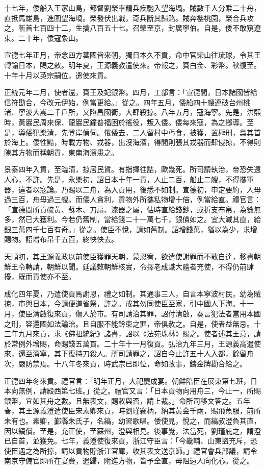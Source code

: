 \begin{pinyinscope}
十七年，倭船入王家山島，都督劉榮率精兵疾馳入望海堝。賊數千人分乘二十舟，直抵馬雄島，進圍望海堝。榮發伏出戰，奇兵斷其歸路。賊奔櫻桃園，榮合兵攻之，斬首七百四十二，生擒八百五十七。召榮至京，封廣寧伯。自是，倭不敢窺遼東。二十年，倭寇象山。

宣德七年正月，帝念四方蕃國皆來朝，獨日本久不貢，命中官柴山往琉球，令其王轉諭日本，賜之敕。明年夏，王源義教遣使來。帝報之，賚白金、彩幣。秋復至。十年十月以英宗嗣位，遣使來貢。

正統元年二月，使者還，賚王及妃銀幣。四月，工部言：「宣德間，日本諸國皆給信符勘合，今改元伊始，例當更給。」從之。四年五月，倭船四十艘連破台州桃渚、寧波大嵩二千戶所，又陷昌國衛，大肆殺掠。八年五月，寇海寧。先是，洪熙時，黃巖民周來保、龍巖民鐘普福困於徭役，叛入倭。倭每來寇，為之鄉導。至是，導倭犯樂清，先登岸偵伺。俄倭去，二人留村中丐食，被獲，置極刑，梟其首於海上。倭性黠，時載方物、戎器，出沒海濱，得間則張其戎器而肆侵掠，不得則陳其方物而稱朝貢，東南海濱患之。

景泰四年入貢，至臨清，掠居民貨。有指揮往詰，歐幾死。所司請執治，帝恐失遠人心，不許。先是，永樂初，詔日本十年一貢，人止二百，船止二艘，不得攜軍器，違者以寇論。乃賜以二舟，為入貢用，後悉不如制。宣德初，申定要約，人毋過三百，舟毋過三艘。而倭人貪利，貢物外所攜私物增十倍，例當給直。禮官言：「宣德間所貢硫黃、蘇木、刀扇、漆器之屬，估時直給錢鈔，或折支布帛，為數無多，然已大獲利。今若仍舊制，當給錢二十一萬七千，銀價如之。宜大減其直，給銀三萬四千七百有奇。」從之。使臣不悅，請如舊制。詔增錢萬，猶以為少，求增賜物。詔增布帛千五百，終怏怏去。

天順初，其王源義政以前使臣獲罪天朝，蒙恩宥，欲遣使謝罪而不敢自達，移書朝鮮王令轉請，朝鮮以聞。廷議敕朝鮮核實，令擇老成識大體者充使，不得仍前肆擾，既而貢使亦不至。

成化四年夏，乃遣使貢馬謝恩，禮之如制。其通事三人，自言本寧波村民，幼為賊掠，市與日本，今請便道省祭，許之。戒其勿同使臣至家，引中國人下海。十一月，使臣清啟復來貢，傷人於市。有司請治其罪，詔付清啟，奏言犯法者當用本國之刑，容還國如法論治。且自服不能鈐束之罪，帝俱赦之。自是，使者益無忌。十三年九月來貢，求《佛祖統紀》諸書，詔以《法苑珠林》賜之。使者述其王意，請於常例外增賜，命賜錢五萬貫。二十年十一月復貢。弘治九年三月，王源義高遣使來，還至濟寧，其下復持刀殺人。所司請罪之，詔自今止許五十人入都，餘留舟次，嚴防禁焉。十八年冬來貢，時武宗已即位，命如故事，鑄金牌勘合給之。

正德四年冬來貢。禮官言：「明年正月，大祀慶成宴。朝鮮陪臣在展東第七班，日本向無例，請殿西第七班。」從之。禮官又言：「日本貢物向用舟三，今止一，所賜銀幣，宜如其舟之數。且無表文，賜敕與否，請上裁。」命所司移文答之。五年春，其王源義澄遣使臣宋素卿來貢，時劉瑾竊柄，納其黃金千兩，賜飛魚服，前所未有也。素卿，鄞縣朱氏子，名縞，幼習歌唱。倭使見，悅之，而縞叔澄負其直，因以縞償。至是，充正使，至蘇州，澄與相見。後事覺，法當死，劉瑾庇之，謂澄已自首，並獲免。七年，義澄使復來貢，浙江守臣言：「今畿輔、山東盜充斥，恐使臣遇之為所掠，請以貢物貯浙江官庫，收其表文送京師。」禮官會兵部議，請令南京守備官即所在宴賚，遣歸，附進方物，皆予全直，毋阻遠人向化心。從之。


\end{pinyinscope}
